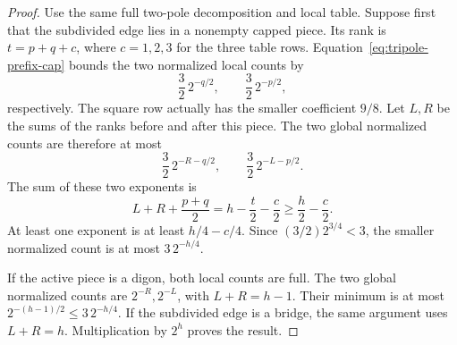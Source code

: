 \begin{proof}
Use the same full two-pole decomposition and local table.
Suppose first that the subdivided edge lies in a nonempty capped piece.
Its rank is $t=p+q+c$, where $c=1,2,3$ for the three table rows.
Equation~\eqref{eq:tripole-prefix-cap} bounds the two normalized local counts by
\[
 \frac32\,2^{-q/2},\qquad \frac32\,2^{-p/2},
\]
respectively. The square row actually has the smaller coefficient $9/8$.
Let $L,R$ be the sums of the ranks before and after this piece.
The two global normalized counts are therefore at most
\[
 \frac32\,2^{-R-q/2},\qquad \frac32\,2^{-L-p/2}.
\]
The sum of these two exponents is
\[
 L+R+\frac{p+q}{2}
 =h-\frac t2-\frac c2\ge\frac h2-\frac c2.
\]
At least one exponent is at least $h/4-c/4$.
Since $(3/2)2^{3/4}<3$, the smaller normalized count is at most
$3\,2^{-h/4}$.

If the active piece is a digon, both local counts are full.
The two global normalized counts are $2^{-R},2^{-L}$, with $L+R=h-1$.
Their minimum is at most $2^{-(h-1)/2}\le3\,2^{-h/4}$.
If the subdivided edge is a bridge, the same argument uses $L+R=h$.
Multiplication by $2^h$ proves the result.
\end{proof}
